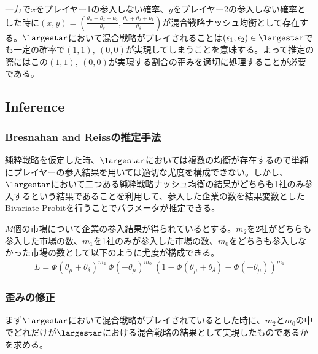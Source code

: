 \documentclass{jsarticle}
\begin{document}
一方で$x$をプレイヤー1の参入しない確率、$y$をプレイヤー2の参入しない確率とした時に$(x, y) = \left( \frac{\theta_{\mu} + \theta_{\delta} + \nu_2}{\theta_{\delta}} ,  \frac{\theta_{\mu} + \theta_{\delta} + \nu_1}{\theta_{\delta}} \right)$が混合戦略ナッシュ均衡として存在する。$\largestar$において混合戦略がプレイされることは$(\epsilon_1, \epsilon_2) \in \largestar$でも一定の確率で$(1,1),\ (0,0)$が実現してしまうことを意味する。よって推定の際にはこの$(1,1),\ (0,0)$が実現する割合の歪みを適切に処理することが必要である。

\subsection{Inference}
\subsubsection{Bresnahan and Reissの推定手法}
純粋戦略を仮定した時、$\largestar$においては複数の均衡が存在するので単純にプレイヤーの参入結果を用いては適切な尤度を構成できない。しかし、$\largestar$において二つある純粋戦略ナッシュ均衡の結果がどちらも1社のみ参入するという結果であることを利用して、参入した企業の数を結果変数としたBivariate Probitを行うことでパラメータが推定できる。

$M$個の市場について企業の参入結果が得られているとする。$m_2$を2社がどちらも参入した市場の数、$m_1$を1社のみが参入した市場の数、$m_0$をどちらも参入しなかった市場の数として以下のように尤度が構成できる。
\begin{align*}
	L = \Phi(\theta_{\mu}+\theta_{\delta})^{m_2}\ \Phi(-\theta_{\mu})^{m_0}\  (1- \Phi(\theta_{\mu}+\theta_{\delta}) - \Phi(-\theta_{\mu}))^{m_1}
\end{align*}

\subsubsection{歪みの修正}
まず$\largestar$において混合戦略がプレイされているとした時に、$m_2$と$m_0$の中でどれだけが$\largestar$における混合戦略の結果として実現したものであるかを求める。
\end{document}
